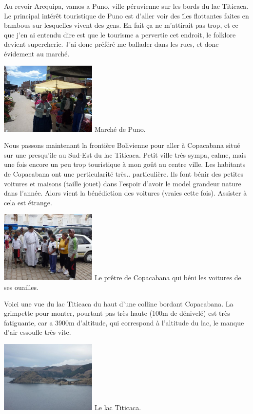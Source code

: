 \begin{multicols}{2}
Au revoir Arequipa, vamos a Puno, ville péruvienne sur les bords du lac Titicaca. Le principal intérêt touristique de Puno est d'aller voir des îles flottantes faites en bambous sur lesquelles vivent des gens. En fait ça ne m'attirait pas trop, et ce que j'en ai entendu dire est que le tourisme a pervertie cet endroit, le folklore devient supercherie. J'ai donc préféré me ballader dans les rues, et donc évidement au marché.

\hspace*{-0.65cm}
\includegraphics[width=4.8cm]{articles/Arequipa-colca-titicaca/12566069210hdx.jpg}
Marché de Puno.

Nous passons maintenant la frontière Bolivienne pour aller à Copacabana situé sur une presqu'ile au Sud-Est du lac Titicaca. Petit ville très sympa, calme, mais une fois encore un peu trop touristique à mon goût au centre ville. Les habitants de Copacabana ont une perticularité très.. particulière. Ils font bénir des petites voitures et maisons (taille jouet) dans l'espoir d'avoir le model grandeur nature dans l'année. Alors vient la bénédiction des voitures (vraies cette fois). Assister à cela est étrange.

\hspace*{-0.65cm}
\includegraphics[width=4.8cm]{articles/Arequipa-colca-titicaca/1256606967Syll.jpg}
Le prêtre de Copacabana qui béni les voitures de ses ouailles.

Voici une vue du lac Titicaca du haut d'une colline bordant Copacabana. La grimpette pour monter, pourtant pas très haute (100m de dénivelé) est très fatiguante, car a 3900m d'altitude, qui correspond à l'altitude du lac, le manque d'air essoufle très vite.

\hspace*{-0.65cm}
\includegraphics[width=4.8cm]{articles/Arequipa-colca-titicaca/125660697038LL.jpg}
Le lac Titicaca.


\end{multicols}
